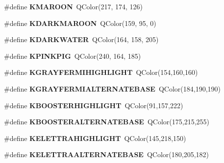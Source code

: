 \begin{DoxyCompactItemize}
\#define {\bf K\+M\+A\+R\+O\+ON}~Q\+Color(217, 174, 126)
\item 
\#define {\bf K\+D\+A\+R\+K\+M\+A\+R\+O\+ON}~Q\+Color(159, 95, 0)
\item 
\#define {\bf K\+D\+A\+R\+K\+W\+A\+T\+ER}~Q\+Color(164, 158, 205)
\item 
\#define {\bf K\+P\+I\+N\+K\+P\+IG}~Q\+Color(240, 164, 185)
\item 
\#define {\bf K\+G\+R\+A\+Y\+F\+E\+R\+M\+I\+H\+I\+G\+H\+L\+I\+G\+HT}~Q\+Color(154,160,160)
\item 
\#define {\bf K\+G\+R\+A\+Y\+F\+E\+R\+M\+I\+A\+L\+T\+E\+R\+N\+A\+T\+E\+B\+A\+SE}~Q\+Color(184,190,190)
\item 
\#define {\bf K\+B\+O\+O\+S\+T\+E\+R\+H\+I\+G\+H\+L\+I\+G\+HT}~Q\+Color(91,157,222)
\item 
\#define {\bf K\+B\+O\+O\+S\+T\+E\+R\+A\+L\+T\+E\+R\+N\+A\+T\+E\+B\+A\+SE}~Q\+Color(175,215,255)
\item 
\#define {\bf K\+E\+L\+E\+T\+T\+R\+A\+H\+I\+G\+H\+L\+I\+G\+HT}~Q\+Color(145,218,150)
\item 
\#define {\bf K\+E\+L\+E\+T\+T\+R\+A\+A\+L\+T\+E\+R\+N\+A\+T\+E\+B\+A\+SE}~Q\+Color(180,205,182)
\end{DoxyCompactItemize}
